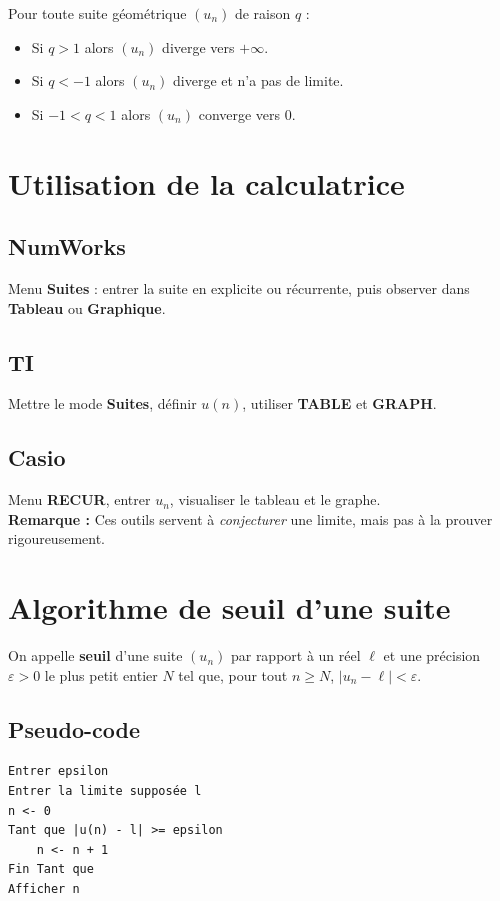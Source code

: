 \documentclass[11pt,a4paper,openany]{book}
\theoremstyle{definition}
\begin{document}
    \begin{Propriété}
    Pour toute suite géométrique $(u_n)$ de raison $q$ :
    \begin{itemize}
        \item Si $q>1$ alors $(u_n)$ diverge vers $+\infty$.
        \item Si $q<-1$ alors $(u_n)$ diverge et n'a pas de limite.
        \item Si $-1<q<1$ alors $(u_n)$ converge vers $0$.
    \end{itemize}
    \end{Propriété}

    \section{Utilisation de la calculatrice}
    \subsection*{NumWorks}
    Menu \textbf{Suites} : entrer la suite en explicite ou récurrente, puis observer dans
    \textbf{Tableau} ou \textbf{Graphique}.
    \subsection*{TI}
    Mettre le mode \textbf{Suites}, définir $u(n)$, utiliser \textbf{TABLE} et \textbf{GRAPH}.
    \subsection*{Casio}
    Menu \textbf{RECUR}, entrer $u_n$, visualiser le tableau et le graphe.
    \medskip\\
    \textbf{Remarque :} Ces outils servent à \emph{conjecturer} une limite, mais pas à la
    prouver rigoureusement.

    \section{Algorithme de seuil d'une suite}
    \begin{Définition}
    On appelle \textbf{seuil} d'une suite $(u_n)$ par rapport à un réel $\ell$ et une
    précision $\varepsilon>0$ le plus petit entier $N$ tel que, pour tout $n \geq N$,
    $|u_n-\ell|<\varepsilon$.
    \end{Définition}

    \subsection*{Pseudo-code}
    \begin{verbatim}
Entrer epsilon
Entrer la limite supposée l
n <- 0
Tant que |u(n) - l| >= epsilon
    n <- n + 1
Fin Tant que
Afficher n
    \end{verbatim}
\end{document}
